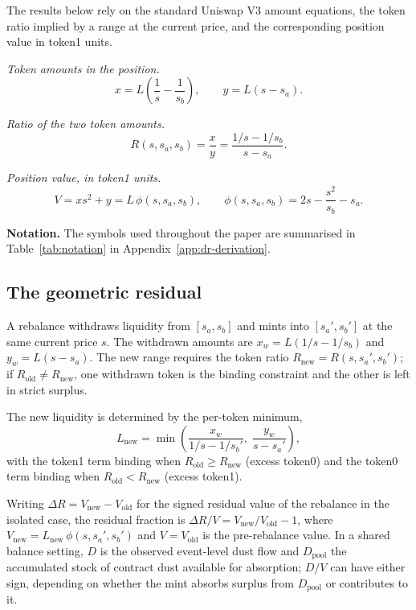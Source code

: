 \documentclass{manuscript}
\begin{document}
The results below rely on the standard Uniswap V3 amount equations, the token ratio implied by a range at the current price, and the corresponding position value in token1 units.

\medskip
\noindent\emph{Token amounts in the position.}
\begin{equation}\label{eq:amounts}
x = L \left(\frac{1}{s} - \frac{1}{s_b}\right),
\qquad
y = L (s - s_a).
\end{equation}

\noindent\emph{Ratio of the two token amounts.}
\begin{equation}\label{eq:ratio}
R(s, s_a, s_b) = \frac{x}{y} = \frac{1/s - 1/s_b}{s - s_a}.
\end{equation}

\noindent\emph{Position value, in token1 units.}
\begin{equation}\label{eq:value}
V = x s^2 + y = L\,\phi(s, s_a, s_b),
\qquad
\phi(s, s_a, s_b) = 2s - \frac{s^2}{s_b} - s_a.
\end{equation}

\textbf{Notation.} The symbols used throughout the paper are summarised in Table~\ref{tab:notation} in Appendix~\ref{app:dr-derivation}.

\subsection{The geometric residual}\label{sec:residual}

A rebalance withdraws liquidity from $[s_a, s_b]$ and mints into $[s_a', s_b']$ at the same current price $s$. The withdrawn amounts are $x_w = L(1/s - 1/s_b)$ and $y_w = L(s - s_a)$. The new range requires the token ratio $R_{\text{new}} = R(s, s_a', s_b')$; if $R_{\text{old}} \neq R_{\text{new}}$, one withdrawn token is the binding constraint and the other is left in strict surplus.

The new liquidity is determined by the per-token minimum,
\begin{equation}\label{eq:lnew-min}
L_{\text{new}} = \min\!\left(\frac{x_w}{1/s - 1/s_b'}, \; \frac{y_w}{s - s_a'}\right),
\end{equation}
with the token1 term binding when $R_{\text{old}} \geq R_{\text{new}}$ (excess token0) and the token0 term binding when $R_{\text{old}} < R_{\text{new}}$ (excess token1).

Writing $\Delta R = V_{\text{new}} - V_{\text{old}}$ for the signed residual value of the rebalance in the isolated case, the residual fraction is $\Delta R/V = V_{\text{new}}/V_{\text{old}} - 1$, where $V_{\text{new}} = L_{\text{new}}\,\phi(s, s_a', s_b')$ and $V = V_{\text{old}}$ is the pre-rebalance value. In a shared balance setting, $D$ is the observed event-level dust flow and $D_{\text{pool}}$ the accumulated stock of contract dust available for absorption; $D/V$ can have either sign, depending on whether the mint absorbs surplus from $D_{\text{pool}}$ or contributes to it.
\end{document}
